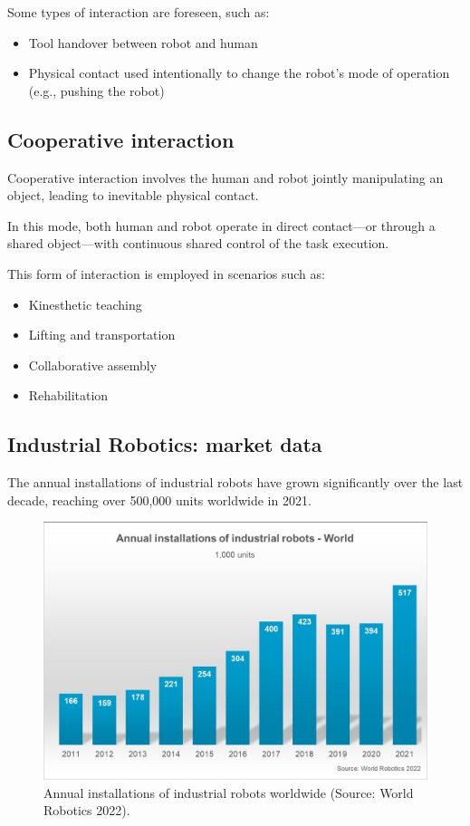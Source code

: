 Some types of interaction are foreseen, such as:
\begin{itemize}
  \item Tool handover between robot and human
  \item Physical contact used intentionally to change the robot’s mode of operation (e.g., pushing the robot)
\end{itemize}

\hfill

\subsection{Cooperative interaction}

Cooperative interaction involves the human and robot jointly manipulating an object, leading to inevitable physical contact.

In this mode, both human and robot operate in direct contact—or through a shared object—with continuous shared control of the task execution.

This form of interaction is employed in scenarios such as:
\begin{itemize}
  \item Kinesthetic teaching
  \item Lifting and transportation
  \item Collaborative assembly
  \item Rehabilitation
\end{itemize}

\hfill

\subsection{Industrial Robotics: market data}

The annual installations of industrial robots have grown significantly over the last decade, reaching over 500,000 units worldwide in 2021.

\begin{figure}[H]
  \centering
  \includegraphics[width=0.85\linewidth]{imgs/industrial_robotics_world_installations.png}
  \caption{Annual installations of industrial robots worldwide (Source: World Robotics 2022).}
\end{figure}

